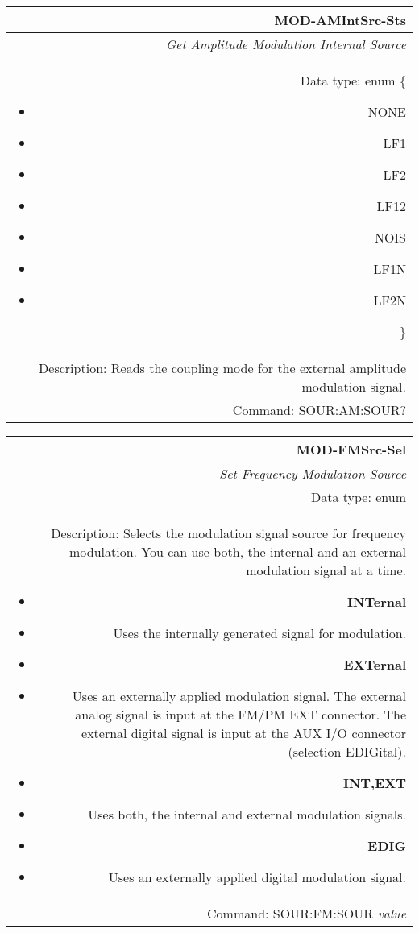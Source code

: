 \documentclass[openany]{article}
\begin{document}
		\begin{tabular}{N}
			\hline
			\bfseries MOD-AMIntSrc-Sts \\ \hline
			\emph{Get Amplitude Modulation Internal Source} \\
			Data type: enum \{\begin{itemize}[noitemsep]
				\small
				\item[] NONE
				\item[] LF1
				\item[] LF2
				\item[] LF12
				\item[] NOIS
				\item[] LF1N
				\item[] LF2N
			\end{itemize}\} \\ 
			Description: Reads the coupling mode for the external amplitude modulation signal. \\
			Command: SOUR:AM:SOUR? \\

		\end{tabular}
%
		\begin{tabular}{N}
			\hline
			\bfseries MOD-FMSrc-Sel \\ \hline
			\emph{Set Frequency Modulation Source} \\
			Data type: enum \\  
			Description: Selects the modulation signal source for frequency modulation. You can use both, the internal and an external modulation signal at a time.\begin{itemize}[noitemsep]
				\small
				\item[] \textbf{INTernal}
				\item[] Uses the internally generated signal for modulation.
				\item[] \textbf{EXTernal}
				\item[]	Uses an externally applied modulation signal. The external analog signal is input at the FM/PM EXT connector. The external digital signal is input at the AUX I/O connector (selection EDIGital).
				\item[] \textbf{INT,EXT} 
				\item[]	Uses both, the internal and external modulation signals.
				\item[] \textbf{EDIG} 
				\item[]	Uses an externally applied digital modulation signal.
			\end{itemize} \\
			Command: SOUR:FM:SOUR \emph{value} \\

		\end{tabular}
\end{document}
